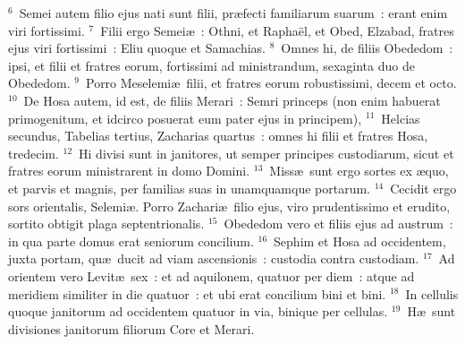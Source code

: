 ${}^{6}$~Semei autem filio ejus nati sunt filii, pr\ae fecti familiarum suarum~: erant enim viri fortissimi.
${}^{7}$~Filii ergo Semei\ae~: Othni, et Rapha\"el, et Obed, Elzabad, fratres ejus viri fortissimi~: Eliu quoque et Samachias.
${}^{8}$~Omnes hi, de filiis Obededom~: ipsi, et filii et fratres eorum, fortissimi ad ministrandum, sexaginta duo de Obededom.
${}^{9}$~Porro Meselemi\ae\ filii, et fratres eorum robustissimi, decem et octo.
${}^{10}$~De Hosa autem, id est, de filiis Merari~: Semri princeps (non enim habuerat primogenitum, et idcirco posuerat eum pater ejus in principem),
${}^{11}$~Helcias secundus, Tabelias tertius, Zacharias quartus~: omnes hi filii et fratres Hosa, tredecim.
${}^{12}$~Hi divisi sunt in janitores, ut semper principes custodiarum, sicut et fratres eorum ministrarent in domo Domini.
${}^{13}$~Miss\ae\ sunt ergo sortes ex \ae quo, et parvis et magnis, per familias suas in unamquamque portarum.
${}^{14}$~Cecidit ergo sors orientalis, Selemi\ae . Porro Zachari\ae\ filio ejus, viro prudentissimo et erudito, sortito obtigit plaga septentrionalis.
${}^{15}$~Obededom vero et filiis ejus ad austrum~: in qua parte domus erat seniorum concilium.
${}^{16}$~Sephim et Hosa ad occidentem, juxta portam, qu\ae\ ducit ad viam ascensionis~: custodia contra custodiam.
${}^{17}$~Ad orientem vero Levit\ae\ sex~: et ad aquilonem, quatuor per diem~: atque ad meridiem similiter in die quatuor~: et ubi erat concilium bini et bini.
${}^{18}$~In cellulis quoque janitorum ad occidentem quatuor in via, binique per cellulas.
${}^{19}$~H\ae\ sunt divisiones janitorum filiorum Core et Merari.


